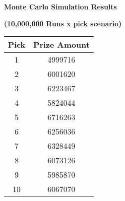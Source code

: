 \documentclass{article}
\begin{document}
\vspace{1cm}
\begin{center}
\textbf{Monte Carlo Simulation Results}
\end{center}
\begin{center}
\textbf{(10,000,000 Runs x pick scenario)}
\end{center}
\begin{center}
\begin{tabular}{cc}
\toprule
Pick & Prize Amount \\
\midrule
1 & 4999716\\
2 & 6001620\\
3 & 6223467\\
4 & 5824044\\
5 & 6716263\\
6 & 6256036\\
7 & 6328449\\
8 & 6073126\\
9 & 5985870\\
10 & 6067070\\
\bottomrule
\end{tabular}
\end{center}
\end{document}

